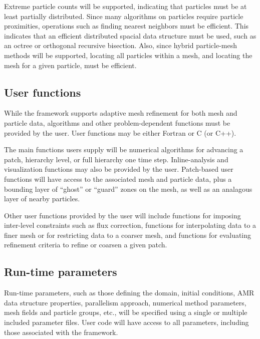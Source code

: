 \documentclass[10pt]{article}
\begin{document}
Extreme particle counts will be supported, indicating that particles
must be at least partially distributed.  Since many algorithms on
particles require particle proximities, operations such as finding
nearest neighbors must be efficient.  This indicates that an efficient
distributed spacial data structure must be used, such as an octree or
orthogonal recursive bisection.  Also, since hybrid particle-mesh
methods will be supported, locating all particles within a mesh, and
locating the mesh for a given particle, must be efficient.


\subsection{User functions} \label{ss:require-user}

While the framework supports adaptive mesh refinement for both mesh
and particle data, algorithms and other problem-dependent functions
must be provided by the user.  User functions may be either Fortran or
C (or C++).  

The main functions users supply will be numerical algorithms for
advancing a patch, hierarchy level, or full hierarchy one time step.
Inline-analysis and visualization functions may also be provided by
the user.  Patch-based user functions will have access to the
associated mesh and particle data, plus a bounding layer of ``ghost''
or ``guard'' zones on the mesh, as well as an analagous layer of
nearby particles.

Other user functions provided by the user will include functions for
imposing inter-level constraints such as flux correction, functions
for interpolating data to a finer mesh or for restricting data to a
coarser mesh, and functions for evaluating refinement criteria to
refine or coarsen a given patch.


\subsection{Run-time parameters} \label{ss:require-parameters}

Run-time parameters, such as those defining the domain, initial
conditions, AMR data structure properties, parallelism approach,
numerical method parameters, mesh fields and particle groups, etc.,
will be specified using a single or multiple included parameter files.
User code will have access to all parameters, including those
associated with the framework.
\end{document}
